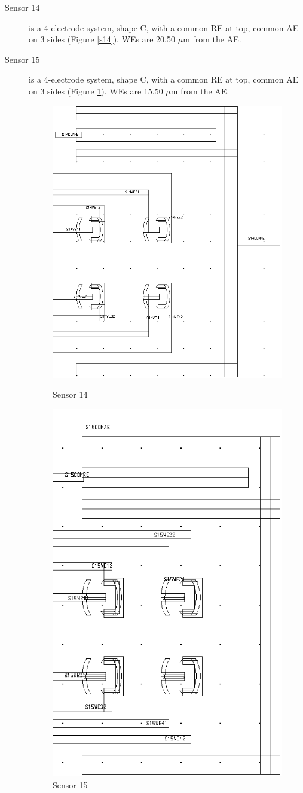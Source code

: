 \begin{description}
\item[Sensor 14] is a 4-electrode system, shape C, with a common RE at top, common AE on 3 sides (Figure \ref{s14}). WEs are 20.50 $\mu \mathrm{m}$ from the AE.
\item[Sensor 15] is a 4-electrode system, shape C, with a common RE at top, common AE on 3 sides (Figure \ref{s15}). WEs are 15.50 $\mu \mathrm{m}$ from the AE.

\begin{figure}
	\begin{minipage}{0.5\linewidth}
		\centering
		\includegraphics[width=0.6\linewidth]{figures/s14.png}
		\caption{Sensor 14}
		\label{s14}
	\end{minipage}
	\begin{minipage}{0.5\linewidth}
		\centering
		\includegraphics[width=0.6\linewidth]{figures/s15.png}
		\caption{Sensor 15}
		\label{s15}
	\end{minipage}
\end{figure}


\end{description}

